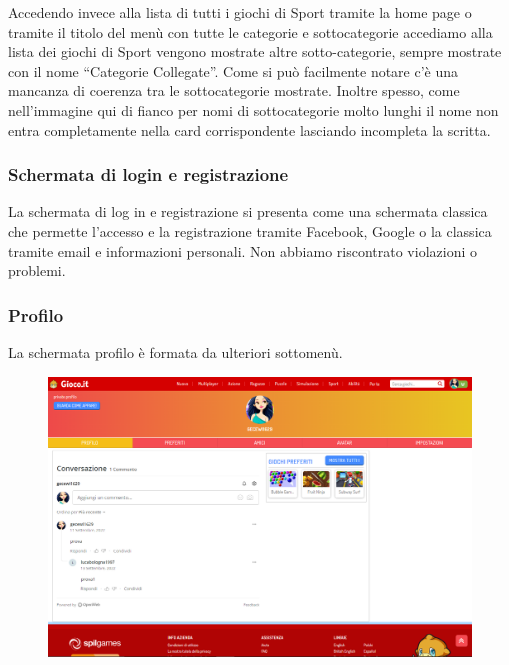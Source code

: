 \documentclass[../Report.tex]{subfiles}
\begin{document}
    Accedendo invece alla lista di tutti i giochi di Sport tramite la home page o tramite il titolo del menù con tutte le categorie e sottocategorie accediamo alla lista dei giochi di Sport vengono mostrate altre sotto-categorie, sempre mostrate con il nome “Categorie Collegate”. Come si può facilmente notare c’è una mancanza di coerenza tra le sottocategorie mostrate. Inoltre spesso, come nell’immagine qui di fianco per nomi di sottocategorie molto lunghi il nome non entra completamente nella card corrispondente lasciando incompleta la scritta.

    \newpage

    \subsubsection{Schermata di login e registrazione}
    La schermata di log in e registrazione si presenta come una schermata classica che permette l’accesso  e la registrazione tramite Facebook, Google o la classica tramite email e informazioni personali.
    Non abbiamo riscontrato violazioni o problemi. 

    \subsubsection{Profilo}
    La schermata profilo è formata da ulteriori sottomenù.

    \begin{figure}[H]
        \includegraphics[width=\linewidth]{Assestment13.png}
        \centering
    \end{figure}
\end{document}
